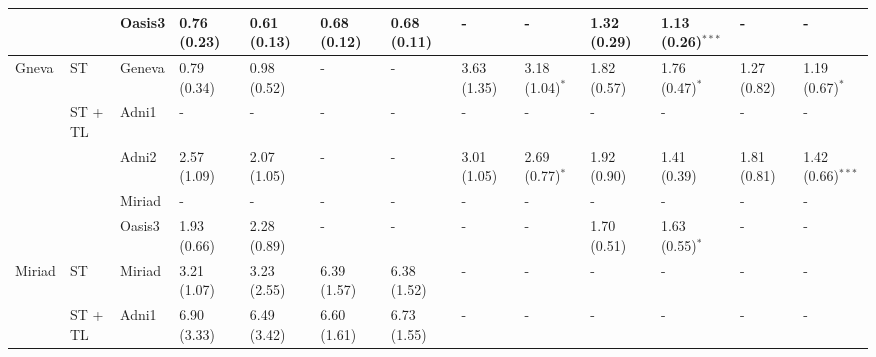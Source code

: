 \begin{table*}
{\begin{tabular}{lllllllllllll}
       &                 & Oasis3          &  0.76 (0.23) &  0.61 (0.13)       &  0.68 (0.12) &  0.68 (0.11)         &            - &            -         &  1.32 (0.29) &  1.13 (0.26)$^{***}$ &            - &            -         \\
\toprule
Gneva &           ST    & Geneva          &  0.79 (0.34) &  0.98 (0.52)       &            - &            -         &  3.63 (1.35) &  3.18 (1.04)$^{*}$   &  1.82 (0.57) &  1.76 (0.47)$^{*}$   &  1.27 (0.82) &  1.19 (0.67)$^{*}$   \\
\cmidrule(lr){2-13}
       &        ST + TL  & Adni1           &            - &            -       &            - &            -         &            - &            -         &            - &            -         &            - &            -         \\
       &                 & Adni2           &  2.57 (1.09) &  2.07 (1.05)       &            - &            -         &  3.01 (1.05) &  2.69 (0.77)$^{*}$   &  1.92 (0.90) &  1.41 (0.39)         &  1.81 (0.81) &  1.42 (0.66)$^{***}$ \\
       &                 & Miriad          &            - &            -       &            - &            -         &            - &            -         &            - &            -         &            - &            -         \\
       &                 & Oasis3          &  1.93 (0.66) &  2.28 (0.89)       &            - &            -         &            - &            -         &  1.70 (0.51) &  1.63 (0.55)$^{*}$   &            - &            -         \\
\toprule
Miriad &            ST   & Miriad          &  3.21 (1.07) &  3.23 (2.55)       &  6.39 (1.57) &  6.38 (1.52)         &            - &            -         &            - &            -         &            - &            -         \\
\cmidrule(lr){2-13}
       &        ST + TL  & Adni1           &  6.90 (3.33) &  6.49 (3.42)       &  6.60 (1.61) &  6.73 (1.55)         &            - &            -         &            - &            -         &            - &            -         \\

\end{tabular}}
\end{table*}
